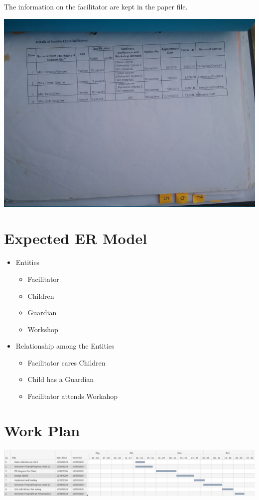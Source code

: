 \documentclass{scrreprt}
\begin{document}
\begin{itemize}
		The information on the facilitator are kept in the paper file.
		
		\includegraphics[scale=.2]{17}
	\end{itemize}
	
	
	\section{Expected ER Model}
	\begin{itemize}
		\item Entities
		\begin{itemize}
			\item Facilitator
			\item Children
			\item Guardian
			\item Workshop
		\end{itemize}
	

		\item Relationship among the Entities
		\begin{itemize}
			\item Facilitator cares Children
			\item Child has a Guardian
			\item Facilitator attends Workahop
		\end{itemize}
	\end{itemize}
	\section{Work Plan}
	
	\includegraphics[scale=.3]{Gantt Chart}
\end{document}
